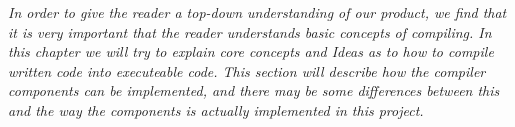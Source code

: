 \textit{In order to give the reader a top-down understanding of our product, we find that it is very important that the reader understands basic concepts of compiling. In this chapter we will try to explain core concepts and Ideas as to how to compile written code into executeable code. This section will describe how the compiler components can be implemented, and there may be some differences between this and the way the components is actually implemented in this project.}